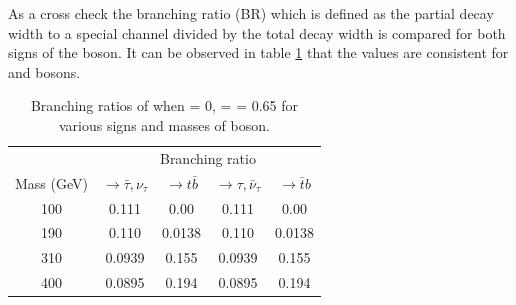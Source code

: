 As a cross check the branching ratio (BR) which is defined as the partial decay width to a special channel divided by the total decay width is compared for both signs of the \wprime boson. 
It can be observed in table \ref{tab:W'BR} that the values are consistent for \wprimep and \wprimem bosons. 
\begin{table}[htb]
	\centering
	\caption{Branching ratios of \wprime  when \gR = 0, \gL = \gSM = 0.65 for various signs and masses of \wprime boson. \label{tab:W'BR} }
	\begin{tabular}{|c|c|c|c|c|}
		\hline 
		                   & \multicolumn{4}{c|}{Branching ratio}\\\cline{2-5}
		\wprime Mass (GeV) &   \wprimep $\rightarrow \bar{\tau},\nu_\tau $&   \wprimep$\rightarrow  t \bar{b}$ &   \wprimem$\rightarrow \tau,\bar{\nu}_\tau $ &  \wprimem$\rightarrow  \bar{t}b $ \\
		\hline 
		100  & 0.111  & 0.00   & 0.111  & 0.00\\
		190  & 0.110  & 0.0138 & 0.110  & 0.0138\\
		310  & 0.0939 & 0.155  & 0.0939 & 0.155\\
		400  & 0.0895 & 0.194  & 0.0895 & 0.194\\
		\hline
	\end{tabular}
\end{table}

